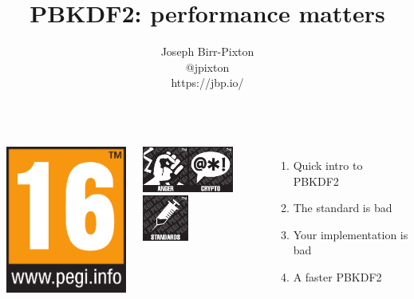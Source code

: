 \documentclass[aspectratio=169]{beamer}
\title[pbkdf2]{PBKDF2: performance matters}
\author{Joseph Birr-Pixton\\
@jpixton\\
https://jbp.io/}
\date{}
\begin{document}
\frame{\titlepage}

\frame
{
  \begin{columns}[c]
      \includegraphics[width=4.7cm]{imgs/16years.png}\vspace{1mm}

      \includegraphics[width=1.5cm]{imgs/anger.png}\hspace{1mm}\includegraphics[width=1.5cm]{imgs/crypto.png}\hspace{1mm}\includegraphics[width=1.5cm]{imgs/standards.png}
      \begin{enumerate}
        \item<1> Quick intro to PBKDF2
        \item<2> The standard is bad
        \item<3> Your implementation is bad
        \item<4> A faster PBKDF2
      \end{enumerate}
  \end{columns}
}
\note{}
\end{document}
